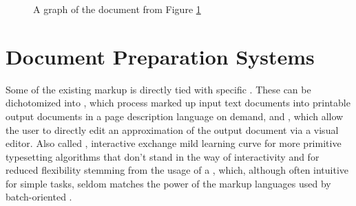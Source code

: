 \begin{figure}
  \label{fig:rdf-doc}
\end{figure}

\begin{figure}
\end{figure}

\begin{figure}
  
  \caption{A graph of the  document from Figure
    \ref{fig:rdf-doc}}
\end{figure}

        
\section{Document Preparation Systems}
Some of the existing markup is directly tied with specific .
These  can be dichotomized into %
, which process marked up input
text documents into printable output documents in a page description language on
demand, and , which
allow the user to directly edit an approximation of the output document via a
visual editor. Also called , interactive  exchange
mild learning curve for more primitive typesetting algorithms that don't stand
in the way of interactivity and for reduced flexibility stemming from the usage
of a , which, although often intuitive for simple tasks, seldom
matches the power of the markup languages used by batch-oriented .

